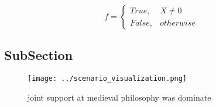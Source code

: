 \documentclass[a4paper]{article}
\begin{document}
\begin{equation}   f =
\begin{cases} True, & X \neq 0\\
False, & otherwise
\end{cases}
\end{equation}

\subsection{SubSection}

\begin{figure}
\centering
\texttt{[image: ../scenario\_visualization.png]}
\caption{joint support at medieval philosophy was dominate
}
\end{figure}
 
\end{document}
